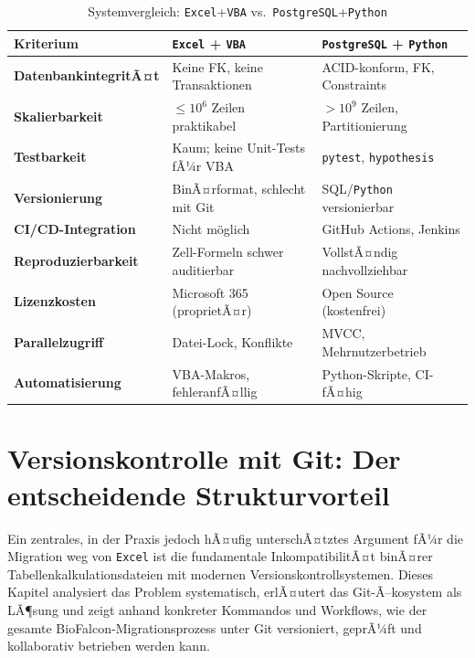 ﻿\documentclass[12pt,a4paper]{report}
\theoremstyle{definition}
\theoremstyle{remark}
\newcommand{\excel}{\texttt{Excel}}
\newcommand{\vba}{\texttt{VBA}}
\newcommand{\pg}{\texttt{PostgreSQL}}
\newcommand{\py}{\texttt{Python}}
\newcommand{\code}[1]{\texttt{#1}}
\begin{document}
\begin{table}[H]
\centering
\caption{Systemvergleich: \excel{}+\vba{} vs.\ \pg{}+\py}
\label{tab:vergleich}
\renewcommand{\arraystretch}{1.35}
\begin{tabularx}{\linewidth}{>{\bfseries\footnotesize}l
                              >{\footnotesize}X
                              >{\footnotesize}X}
\toprule
Kriterium          & \excel{} + \vba{}                       & \pg{} + \py{} \\
\midrule
DatenbankintegritÃ¤t & Keine FK, keine Transaktionen          & ACID-konform, FK, Constraints \\
Skalierbarkeit      & $\leq 10^6$ Zeilen praktikabel         & $> 10^9$ Zeilen, Partitionierung \\
Testbarkeit         & Kaum; keine Unit-Tests fÃ¼r VBA         & \code{pytest}, \code{hypothesis} \\
Versionierung       & BinÃ¤rformat, schlecht mit Git           & SQL/\py{} versionierbar \\
CI/CD-Integration   & Nicht m\"oglich                           & GitHub Actions, Jenkins \\
Reproduzierbarkeit  & Zell-Formeln schwer auditierbar         & VollstÃ¤ndig nachvollziehbar \\
Lizenzkosten        & Microsoft 365 (proprietÃ¤r)             & Open Source (kostenfrei) \\
Parallelzugriff     & Datei-Lock, Konflikte                  & MVCC, Mehrnutzerbetrieb \\
Automatisierung     & VBA-Makros, fehleranfÃ¤llig             & Python-Skripte, CI-fÃ¤hig \\
\bottomrule
\end{tabularx}
\end{table}

\newpage
\chapter{Versionskontrolle mit Git: Der entscheidende Strukturvorteil}
\label{sec:git}

Ein zentrales, in der Praxis jedoch hÃ¤ufig unterschÃ¤tztes Argument fÃ¼r die
Migration weg von \excel{} ist die fundamentale InkompatibilitÃ¤t binÃ¤rer
Tabellenkalkulationsdateien mit modernen Versionskontrollsystemen.
Dieses Kapitel analysiert das Problem systematisch, erlÃ¤utert das
Git-Ã–kosystem als LÃ¶sung und zeigt anhand konkreter Kommandos und
Workflows, wie der gesamte BioFalcon-Migrationsprozess unter Git
versioniert, geprÃ¼ft und kollaborativ betrieben werden kann.
\end{document}
